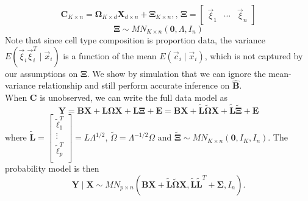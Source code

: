 \documentclass{article}
\begin{document}
\begin{equation}
\bm{C}_{K \times n} = \bm{\Omega}_{K \times d}\bm{X}_{d \times n} + \bm{\Xi}_{K \times n}, \text{, } \bm{\Xi} = \left[ \begin{matrix}
\vec{\xi}_1 & \cdots & \vec{\xi}_n
\end{matrix} \right]
\end{equation}
\begin{equation}
\bm{\Xi} \sim MN_{K \times n}\left( \bm{0}, \Lambda, I_n \right)
\end{equation}
Note that since cell type composition is proportion data, the variance $E\left( \vec{\xi}_i \vec{\xi}_i^T\mid \vec{x}_i\right)$ is a function of the mean $E\left( \vec{c}_i \mid \vec{x}_i \right)$, which is not captured by our assumptions on $\bm{\Xi}$. We show by simulation that we can ignore the mean-variance relationship and still perform accurate inference on $\hat{\bm{B}}$.\\
\indent When $\bm{C}$ is unobserved, we can write the full data model as
\begin{equation}
\bm{Y} = \bm{B}\bm{X} + \bm{L} \bm{\Omega} \bm{X} + \bm{L}\bm{\Xi} + \bm{E} = \bm{B}\bm{X} + \tilde{\bm{L}} \tilde{\bm{\Omega}} \bm{X} + \tilde{\bm{L}}\tilde{\bm{\Xi}} + \bm{E}
\end{equation}
where $\tilde{\bm{L}} = \left[ \begin{matrix}
\tilde{\bm{\ell}}_1^T\\
\vdots\\
\tilde{\bm{\ell}}_p^T\\
\end{matrix} \right] = L\Lambda^{1/2}$, $\tilde{\Omega} = \Lambda^{-1/2}\Omega$ and $\tilde{\bm{\Xi}} \sim MN_{K \times n}\left( \bm{0}, I_K, I_n \right)$. The probability model is then
\begin{equation}
\bm{Y} \mid \bm{X} \sim MN_{p \times n}\left( \bm{B}\bm{X} + \tilde{\bm{L}} \tilde{\bm{\Omega}} \bm{X}, \tilde{\bm{L}} \tilde{\bm{L}}^T + \bm{\Sigma}, I_n \right).
\end{equation}
\end{document}
